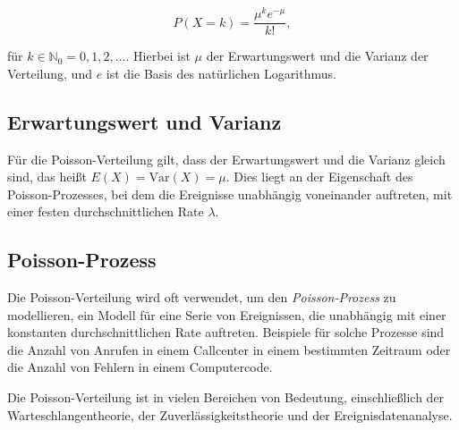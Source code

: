 \[
    P(X = k) = \frac{\mu^k e^{-\mu}}{k!},
\]

für $k \in \mathbb{N}_0 = 0, 1, 2, \dots$.
Hierbei ist $\mu$ der Erwartungswert und die Varianz der Verteilung, und $e$ ist die Basis des natürlichen Logarithmus.

\subsection{Erwartungswert und Varianz}

Für die Poisson-Verteilung gilt, dass der Erwartungswert und die Varianz gleich sind, das heißt $E(X) = \text{Var}(X) = \mu$.
Dies liegt an der Eigenschaft des Poisson-Prozesses, bei dem die Ereignisse unabhängig voneinander auftreten, mit einer festen durchschnittlichen Rate $\lambda$.

\subsection{Poisson-Prozess}

Die Poisson-Verteilung wird oft verwendet, um den \textit{Poisson-Prozess} zu modellieren, ein Modell für eine Serie von Ereignissen, die unabhängig mit einer konstanten durchschnittlichen Rate auftreten.
Beispiele für solche Prozesse sind die Anzahl von Anrufen in einem Callcenter in einem bestimmten Zeitraum oder die Anzahl von Fehlern in einem Computercode.

Die Poisson-Verteilung ist in vielen Bereichen von Bedeutung, einschließlich der Warteschlangentheorie, der Zuverlässigkeitstheorie und der Ereignisdatenanalyse.